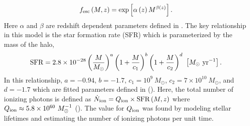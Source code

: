 \begin{equation}
f_{\rm esc} \left( M, z\right) = \exp \left[ \alpha \left(z \right) M^{\beta \left(z \right)} \right].
\end{equation}
Here $\alpha$ and $\beta$ are redshift dependent parameters defined in \cite{2010ApJ...710.1239R}.
The key relationship in this model is the star formation rate (SFR)
which is parameterized by the mass of the halo,
\begin{equation}
  {\rm SFR} = 2.8 \times 10^{-28} \left(\frac{M}{M_{\odot}} \right)^a \left( 1 + \frac{M}{c_1}\right)^b \left(1 + \frac{M}{c_2} \right)^d \ \left[ M_{\odot} \ {\rm yr}^{-1} \right].
\end{equation}
In this relationship, $a = -0.94$, $b = -1.7$, $c_1 = 10^9 \ M_{\odot}$, $c_2 = 7 \times 10^{10} \ M_{\odot}$, and $d = -1.7$ which
are fitted parameters defined in (\cite{2013ApJ...763..132S}). Here, the total number of ionizing photons is defined as $\dot{N}_{\rm ion} = Q_{\rm ion} \times \textrm{SFR} \left(M, z \right)$ where $Q_{\rm ion} \approx 5.8 \times 10^{60} \ M_{\odot}^{-1}$
(\cite{2002A&A...382...28S}). The value for $Q_{\rm ion}$ was found by modeling stellar
lifetimes and estimating the number of ionizing photons per unit time.


